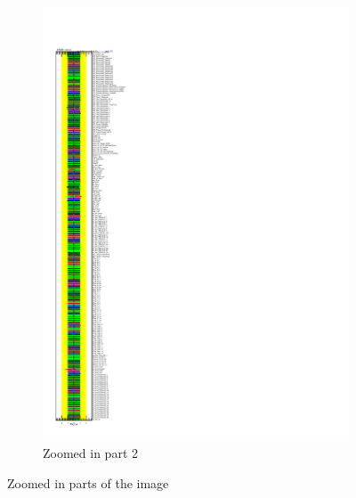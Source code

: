 \begin{figure}[ht]
\begin{subfigure}[b]{0.45\textwidth}
      \includegraphics[width=\textwidth, viewport=100 0 200 100, clip]{figures/diff_xsec/dilep_tty_prod_mu_blinded/compare_NP_pulls/compare_NP_dilep_fits_pt_ptj1_ptll/NuisPar_comp.pdf}
      \caption{Zoomed in part 2}
  \end{subfigure}
  \caption{Zoomed in parts of the image}
  \label{fig:zoomed_image}
\end{figure}

